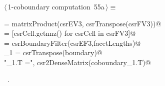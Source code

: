 \documentclass[11pt,oneside]{article}	%
\begin{document}
\begin{flushleft} \small \label{scrap95}
\protect{}$\langle\,$1-coboundary computation\nobreak\ {\footnotesize 55a}$\,\rangle\equiv$
\vspace{-1ex}
\begin{list}{}{} \item
\mbox{} = matrixProduct(csrEV3, csrTranspose(csrFV3))@\\
\mbox{}\verb@facetLengths = [csrCell.getnnz() for csrCell in csrFV3]@\\
\mbox{}\verb@boundary = csrBoundaryFilter(csrEF3,facetLengths)@\\
\mbox{}\verb@coboundary_1 = csrTranspose(boundary)@\\
\mbox{}\verb@print "\ncoboundary_1.T =\n", csr2DenseMatrix(coboundary_1.T)@\\
\mbox{}\verb@@{\NWsep}
\end{list}
\vspace{-1ex}
\footnotesize\addtolength{\baselineskip}{-1ex}
\begin{list}{}{\setlength{\itemsep}{-\parsep}\setlength{\itemindent}{-\leftmargin}}
\item \NWtxtMacroRefIn\ .
\end{list}
\end{flushleft}
\end{document}
